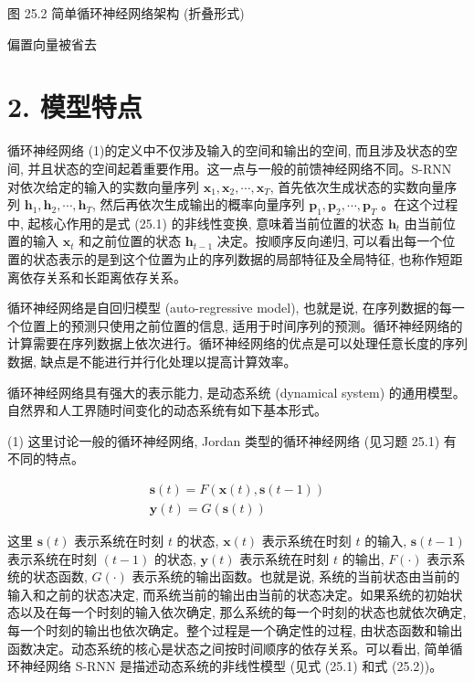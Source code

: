 \documentclass[10pt]{article}
\begin{document}
图 25.2 简单循环神经网络架构 (折叠形式)

偏置向量被省去

\section*{2. 模型特点}
循环神经网络 (1)的定义中不仅涉及输入的空间和输出的空间, 而且涉及状态的空间, 并且状态的空间起着重要作用。这一点与一般的前馈神经网络不同。S-RNN 对依次给定的输入的实数向量序列 $\boldsymbol{x}_{1}, \boldsymbol{x}_{2}, \cdots, \boldsymbol{x}_{T}$, 首先依次生成状态的实数向量序列 $\boldsymbol{h}_{1}, \boldsymbol{h}_{2}, \cdots, \boldsymbol{h}_{T}$, 然后再依次生成输出的概率向量序列 $\boldsymbol{p}_{1}, \boldsymbol{p}_{2}, \cdots, \boldsymbol{p}_{T}$ 。在这个过程中, 起核心作用的是式 (25.1) 的非线性变换, 意味着当前位置的状态 $\boldsymbol{h}_{t}$ 由当前位置的输入 $\boldsymbol{x}_{t}$ 和之前位置的状态 $\boldsymbol{h}_{t-1}$ 决定。按顺序反向递归, 可以看出每一个位置的状态表示的是到这个位置为止的序列数据的局部特征及全局特征, 也称作短距离依存关系和长距离依存关系。

循环神经网络是自回归模型 (auto-regressive model), 也就是说, 在序列数据的每一个位置上的预测只使用之前位置的信息, 适用于时间序列的预测。循环神经网络的计算需要在序列数据上依次进行。循环神经网络的优点是可以处理任意长度的序列数据, 缺点是不能进行并行化处理以提高计算效率。

循环神经网络具有强大的表示能力, 是动态系统 (dynamical system) 的通用模型。自然界和人工界随时间变化的动态系统有如下基本形式。

(1) 这里讨论一般的循环神经网络, Jordan 类型的循环神经网络 (见习题 25.1) 有不同的特点。

$$
\begin{gathered}
\boldsymbol{s}(t)=F(\boldsymbol{x}(t), \boldsymbol{s}(t-1)) \\
\boldsymbol{y}(t)=G(\boldsymbol{s}(t))
\end{gathered}
$$

这里 $\boldsymbol{s}(t)$ 表示系统在时刻 $t$ 的状态, $\boldsymbol{x}(t)$ 表示系统在时刻 $t$ 的输入, $\boldsymbol{s}(t-1)$ 表示系统在时刻 $(t-1)$ 的状态, $\boldsymbol{y}(t)$ 表示系统在时刻 $t$ 的输出, $F(\cdot)$ 表示系统的状态函数, $G(\cdot)$ 表示系统的输出函数。也就是说, 系统的当前状态由当前的输入和之前的状态决定, 而系统当前的输出由当前的状态决定。如果系统的初始状态以及在每一个时刻的输入依次确定, 那么系统的每一个时刻的状态也就依次确定, 每一个时刻的输出也依次确定。整个过程是一个确定性的过程, 由状态函数和输出函数决定。动态系统的核心是状态之间按时间顺序的依存关系。可以看出, 简单循环神经网络 S-RNN 是描述动态系统的非线性模型 (见式 (25.1) 和式 (25.2))。
\end{document}
